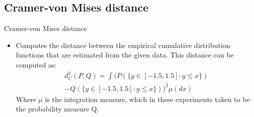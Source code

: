 \documentclass{beamer}
\begin{document}
\subsection{Cramer-von Mises distance}
\begin{frame}{Cramer-von Mises distance}
    \begin{itemize}
        \item Computes the distance between the empirical cumulative distribution functions that are estimated from the given data. This distance can be computed as:
        \begin{equation}
            \begin{split}
                d_C ^2(P, Q) = \int \Big(P(\{y \in [-1.5, 1.5]: y \leq x \})\\
                - Q(\{y \in [-1.5, 1.5]: y \leq x \})\Big)^2 \mu(dx)
        \end{split}
        \end{equation}
        Where $\mu$ is the integration measure, which in these experiments taken to be the probability measure Q. 
    \end{itemize}
\end{frame}
\end{document}
